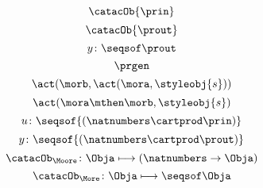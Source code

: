 {\begin{forslides}
\begin{equation}
			\label{eq:Ua}
			\catacOb{\prin}
		\end{equation}
		\begin{equation}
			\label{eq:Ya}
			\catacOb{\prout}
		\end{equation}
		\begin{equation}
			\label{eq:prgen-y-2}
			y\colon \seqsof  \prout
		\end{equation}
		\begin{equation}
			\label{eq:prgen}
			\prgen
		\end{equation}
		\begin{equation}
			\label{eq:now1}
			\act(\morb, \act(\mora, \styleobj{s}))
		\end{equation}
		\begin{equation}
			\label{eq:now2}
			\act(\mora\mthen\morb, \styleobj{s})
		\end{equation}
		\begin{equation}
			\label{eq:ev-sign}
			u\colon \seqsof{(\natnumbers \cartprod \prin)}
		\end{equation}
		\begin{equation}
			\label{eq:ev-sign2}
			y\colon \seqsof{(\natnumbers \cartprod \prout)}
		\end{equation}
		\begin{equation}
			\label{eq:phi-moore}
			{\catacOb_{\Moore}}\colon{\Obja}\longmapsto{(\natnumbers \to \Obja)}
		\end{equation}
		\begin{equation}
			\label{eq:phi-more}
			{\catacOb_{\More}}\colon{\Obja}\longmapsto{\seqsof \Obja}
		\end{equation}
	\end{forslides}
}
